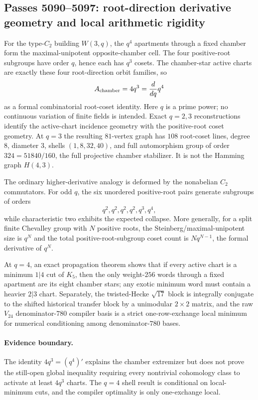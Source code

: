 \ifdefined\WPassFiveZeroNineZeroLoaded\else
\gdef\WPassFiveZeroNineZeroLoaded{1}
\subsection*{Passes 5090--5097: root-direction derivative geometry and local arithmetic rigidity}
For the type-$C_2$ building $W(3,q)$, the $q^4$ apartments through a fixed chamber form the maximal-unipotent opposite-chamber cell.  The four positive-root subgroups have order $q$, hence each has $q^3$ cosets.  The chamber-star active charts are exactly these four root-direction orbit families, so
\[
 A_{\rm chamber}=4q^3=\frac{d}{dq}q^4
\]
as a formal combinatorial root-coset identity.  Here $q$ is a prime power; no continuous variation of finite fields is intended.  Exact $q=2,3$ reconstructions identify the active-chart incidence geometry with the positive-root coset geometry.  At $q=3$ the resulting $81$-vertex graph has $108$ root-coset lines, degree $8$, diameter $3$, shells $(1,8,32,40)$, and full automorphism group of order $324=51840/160$, the full projective chamber stabilizer.  It is not the Hamming graph $H(4,3)$.

The ordinary higher-derivative analogy is deformed by the nonabelian $C_2$ commutators.  For odd $q$, the six unordered positive-root pairs generate subgroups of orders
\[
 q^2,q^2,q^2,q^2,q^3,q^4,
\]
while characteristic two exhibits the expected collapse.  More generally, for a split finite Chevalley group with $N$ positive roots, the Steinberg/maximal-unipotent size is $q^N$ and the total positive-root-subgroup coset count is $Nq^{N-1}$, the formal derivative of $q^N$.

At $q=4$, an exact propagation theorem shows that if every active chart is a minimum $1|4$ cut of $K_5$, then the only weight-$256$ words through a fixed apartment are its eight chamber stars; any exotic minimum word must contain a heavier $2|3$ chart.  Separately, the twisted-Hecke $\sqrt{17}$ block is integrally conjugate to the shifted historical transfer block by a unimodular $2\times2$ matrix, and the raw $V_{24}$ denominator-$780$ compiler basis is a strict one-row-exchange local minimum for numerical conditioning among denominator-$780$ bases.

\paragraph{Evidence boundary.}
The identity $4q^3=(q^4)'$ explains the chamber extremizer but does not prove the still-open global inequality requiring every nontrivial cohomology class to activate at least $4q^3$ charts.  The $q=4$ shell result is conditional on local-minimum cuts, and the compiler optimality is only one-exchange local.
\fi
